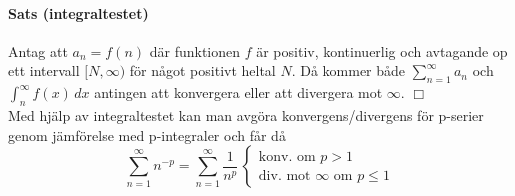 \paragraph{Sats (integraltestet)}
Antag att $a_n=f(n)$ där funktionen $f$ är positiv, kontinuerlig och avtagande op ett intervall $[N,\infty)$ för något positivt heltal $N$.
Då kommer både $\sum_{n=1}^\infty a_n$ och $\int_n^\infty f(x)\, dx$ antingen att konvergera eller att divergera mot $\infty$. $\Box$
\\
Med hjälp av integraltestet kan man avgöra konvergens/divergens för p-serier genom jämförelse med p-integraler och får då
\begin{equation*}
    \sum_{n=1}^\infty n^{-p}=\sum_{n=1}^\infty\frac{1}{n^p}\,
    \left\lbrace
    \begin{matrix}
        \text{konv. om }p>1 \\
        \text{div. mot }\infty\text{ om }p\leq 1
    \end{matrix}
    \right.
\end{equation*}

